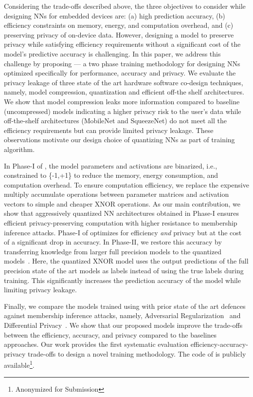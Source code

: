 Considering the trade-offs described above, the three objectives to consider while designing NNs for embedded devices are: (a) high prediction accuracy, (b) efficiency constraints on memory, energy, and computation overhead, and (c) preserving privacy of on-device data.
However, designing a model to preserve privacy while satisfying efficiency requirements without a significant cost of the model’s predictive accuracy is challenging.
In this paper, we address this challenge by proposing \method\hspace{0.02in} — a two phase training methodology for designing NNs optimized specifically for performance, accuracy and privacy.
We evaluate the privacy leakage of three state of the art hardware software co-design techniques, namely, model compression, quantization and efficient off-the shelf architectures.
We show that model compression leaks more information compared to baseline (uncompressed) models indicating a higher privacy risk to the user’s data while off-the-shelf architectures (MobileNet and SqueezeNet) do not meet all the efficiency requirements but can provide limited privacy leakage.
These observations motivate our design choice of quantizing NNs as part of \method\hspace{0.02in} training algorithm.


In Phase-I of \method, the model parameters and activations are binarized, i.e., constrained to \{-1,+1\} to reduce the memory, energy consumption, and computation overhead.
To ensure computation efficiency, we replace the expensive multiply accumulate operations between parameter matrices and activation vectors to simple and cheaper XNOR operations.
As our main contribution, we show that aggressively quantized NN architectures obtained in Phase-I ensures efficient privacy-preserving computation with higher resistance to membership inference attacks.
Phase-I of \method\hspace{0.02in} optimizes for efficiency \textit{and} privacy but at the cost of a significant drop in accuracy.
In Phase-II, we restore this accuracy by transferring knowledge from larger full precision models to the quantized models~\cite{44873}.
Here, the quantized XNOR model uses the output predictions of the full precision state of the art models as labels instead of using the true labels during training.
This significantly increases the prediction accuracy of the model while limiting privacy leakage.


Finally, we compare the models trained using \method\hspace{0.02in} with prior state of the art defences against membership inference attacks, namely, Adversarial Regularization~\cite{DBLP:conf/ccs/NasrSH18} and Differential Privacy~\cite{Abadi:2016:DLD:2976749.2978318}.
We show that our proposed models improve the trade-offs between the efficiency, accuracy, and privacy compared to the baselines approaches.
Our work provides the first systematic evaluation efficiency-accuracy-privacy trade-offs to design a novel training methodology.
The code of \method\hspace{0.02in} is publicly available\footnote{Anonymized for Submission}.

